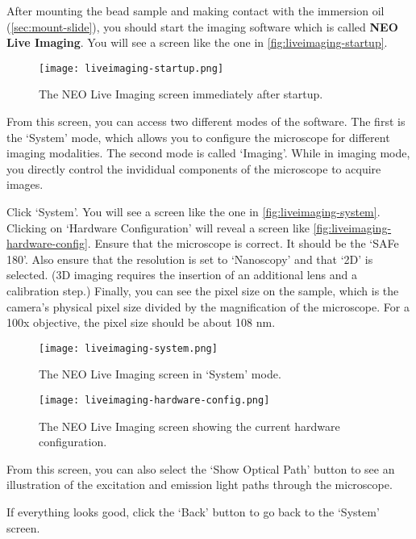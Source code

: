 \documentclass[10pt,a4paper,oneside]{book}
\begin{document}
After mounting the bead sample and making contact with the immersion oil (\autoref{sec:mount-slide}), you should start the imaging software which is called \textbf{NEO Live Imaging}. You will see a screen like the one in \autoref{fig:liveimaging-startup}.

\begin{figure}[ht]
    \centering
    \texttt{[image: liveimaging-startup.png]}
    \caption{The NEO Live Imaging screen immediately after startup.}
    \label{fig:liveimaging-startup}
\end{figure}

From this screen, you can access two different modes of the software. The first is the `System' mode, which allows you to configure the microscope for different imaging modalities. The second mode is called `Imaging'. While in imaging mode, you directly control the invididual components of the microscope to acquire images.

Click `System'. You will see a screen like the one in \autoref{fig:liveimaging-system}. Clicking on `Hardware Configuration' will reveal a screen like \autoref{fig:liveimaging-hardware-config}. Ensure that the microscope is correct. It should be the `SAFe 180'. Also ensure that the resolution is set to `Nanoscopy' and that `2D' is selected. (3D imaging requires the insertion of an additional lens and a calibration step.) Finally, you can see the pixel size on the sample, which is the camera's physical pixel size divided by the magnification of the microscope. For a 100x objective, the pixel size should be about 108 nm.

\begin{figure}[ht]
    \centering
    \texttt{[image: liveimaging-system.png]}
    \caption{The NEO Live Imaging screen in `System' mode.}
    \label{fig:liveimaging-system}
\end{figure}

\begin{figure}[ht]
    \centering
    \texttt{[image: liveimaging-hardware-config.png]}
    \caption{The NEO Live Imaging screen showing the current hardware configuration.}
    \label{fig:liveimaging-hardware-config}
\end{figure}

From this screen, you can also select the `Show Optical Path' button to see an illustration of the excitation and emission light paths through the microscope.

If everything looks good, click the `Back' button to go back to the `System' screen.
\end{document}
